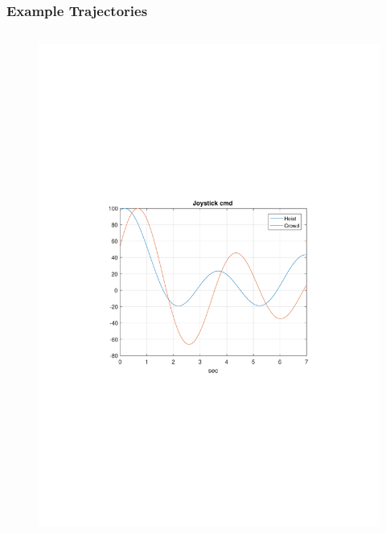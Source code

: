 \documentclass[table]{beamer}
\begin{document}
\begin{frame}[c]
	\frametitle{Example Trajectories}
	\vspace{-.5cm}
	\begin{columns}[c]
		\begin{figure}
			\centering
			\includegraphics[trim=4cm 9cm 4cm 9.5cm, clip=true, width=\linewidth]{img/Example3_Joystick}
			\vskip 0mm

\end{figure}
\end{columns}
\end{frame}
\end{document}
